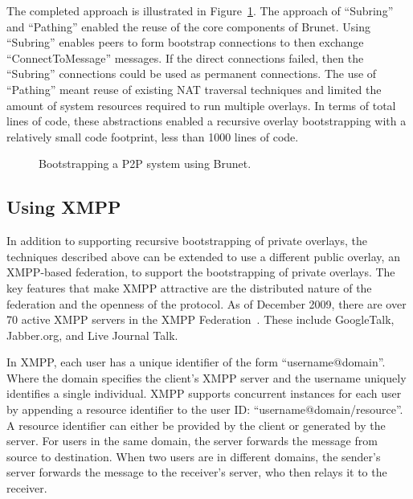 The completed approach is illustrated in Figure~\ref{fig:bootstrap_brunet}.
The approach of ``Subring'' and ``Pathing'' enabled the reuse of the core
components of Brunet.  Using ``Subring'' enables peers to form bootstrap
connections to then exchange ``ConnectToMessage'' messages.  If the direct
connections failed, then the ``Subring'' connections could be used as permanent
connections.  The use of ``Pathing'' meant reuse of existing NAT traversal
techniques and limited the amount of system resources required to run multiple
overlays.  In terms of total lines of code, these abstractions enabled a
recursive overlay bootstrapping with a relatively small code footprint, less
than 1000 lines of code.

\begin{center}
\begin{figure}
\caption{Bootstrapping a P2P system using Brunet.}
\label{fig:bootstrap_brunet}
\end{figure}
\end{center}

\subsection{Using XMPP}
\label{bs:xmpp_bootstrapping}

In addition to supporting recursive bootstrapping of private overlays, the
techniques described above can be extended to use a different public overlay,
an XMPP-based federation, to support the bootstrapping of private overlays.
The key features that make XMPP attractive are the distributed nature of the
federation and the openness of the protocol.  As of December 2009, there are
over 70 active XMPP servers in the XMPP Federation~\cite{xmpp_servers}.  These
include GoogleTalk, Jabber.org, and Live Journal Talk.

In XMPP, each user has a unique identifier of the form ``username@domain''.
Where the domain specifies the client's XMPP server and the username uniquely
identifies a single individual.  XMPP supports concurrent instances for each
user by appending a resource identifier to the user ID:
``username@domain/resource''.  A resource identifier can either be provided by
the client or generated by the server.  For users in the same domain, the
server forwards the message from source to destination.  When two users are in
different domains, the sender's server forwards the message to the receiver's
server, who then relays it to the receiver.

